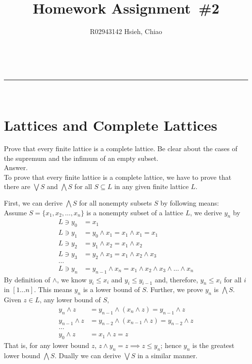 \documentclass[a4paper,11pt]{article}
\makeatletter
\newcommand{\linia}{\rule{\linewidth}{0.5pt}}
\theoremstyle{mytheor}
\renewcommand{\maketitle}{
\begin{center}
\vspace{2ex}
{\huge \textsc{\@title}}
\vspace{1ex}
\\
\linia\\
\@author \hfill \@date
\vspace{4ex}
\end{center}
}
\makeatother
\begin{document}
\title{Homework Assignment~\#2}

\author{R02943142 Hsieh, Chiao}


\maketitle

\section{Lattices and Complete Lattices}
Prove that every finite lattice is a complete lattice. Be clear about the cases
of the supremum and the infimum of an empty subset.
\medskip \\
Answer.
\smallskip \\
To prove that every finite lattice is a complete lattice, we have to prove that
there are $\bigvee S$ and $\bigwedge S$ for all $S \subseteq L$ in any given
finite lattice $L$.

First, we can derive $\bigwedge S$ for all nonempty subsets $S$ by following means:
\smallskip\\
Assume $S=\{x_1,x_2,\dots,x_n\}$ is a nonempty subset of a lattice $L$, we derive
$y_n$ by
\begin{align*}
L \ni y_0 &= x_1 \\
L \ni y_1 &= y_0 \wedge x_1 = x_1 \wedge x_1 = x_1 \\
L \ni y_2 &= y_1 \wedge x_2 = x_1 \wedge x_2 \\
L \ni y_3 &= y_2 \wedge x_3 = x_1 \wedge x_2 \wedge x_3 \\
\dots \\
L \ni y_n &= y_{n-1} \wedge x_n = x_1 \wedge x_2 \wedge x_3 \wedge \dots \wedge x_n
\end{align*}
By definition of $\wedge$, we know $y_i \leq x_i$ and $y_i \leq y_{i-1}$
and, therefore, $y_n \leq x_i$ for all $i$ in $[1 \dots n]$. This means
$y_n$ is a lower bound of $S$. Further, we prove $y_n$ is $\bigwedge S$.
\smallskip\\
Given $z \in L$, any lower bound of $S$,
\begin{align*}
y_n \wedge z &= y_{n-1} \wedge (x_n \wedge z) = y_{n-1} \wedge z \\
y_{n-1} \wedge z &= y_{n-2} \wedge (x_{n-1} \wedge z) = y_{n-2} \wedge z \\
\dots \\
y_0 \wedge z     &= x_1 \wedge z = z
\end{align*}
That is, for any lower bound $z$, $z \wedge y_n = z \implies z \leq y_n$;
hence $y_n$ is the greatest lower bound $\bigwedge S$.
Dually we can derive $\bigvee S$ in a similar manner.
\end{document}

